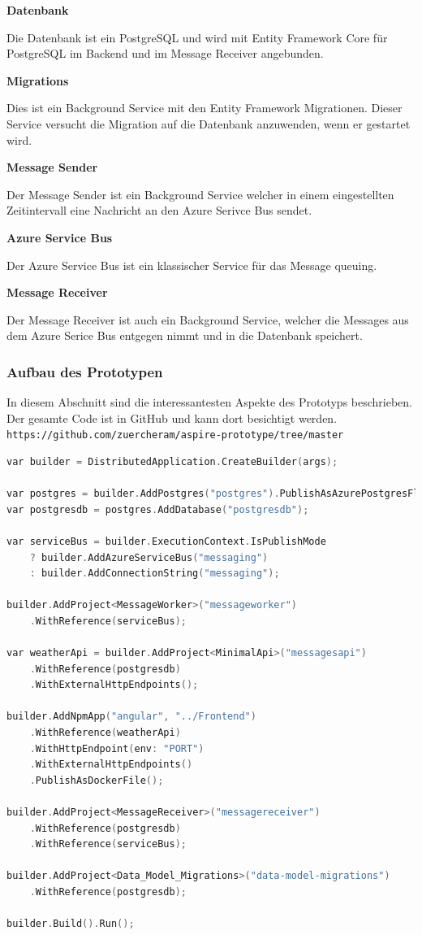             \textbf{Datenbank}

            Die Datenbank ist ein PostgreSQL und wird mit Entity Framework Core für PostgreSQL im Backend und im Message Receiver angebunden.

            \textbf{Migrations}

            Dies ist ein Background Service mit den Entity Framework Migrationen. Dieser Service versucht die Migration auf die Datenbank anzuwenden, wenn er gestartet wird.

            \textbf{Message Sender}
            
            Der Message Sender ist ein Background Service welcher in einem eingestellten Zeitintervall eine Nachricht an den Azure Serivce Bus sendet.

            \textbf{Azure Service Bus}
            
            Der Azure Service Bus ist ein klassischer Service für das Message queuing.

            \textbf{Message Receiver}

            Der Message Receiver ist auch ein Background Service, welcher die Messages aus dem Azure Serice Bus entgegen nimmt und in die Datenbank speichert.

        \subsubsection{Aufbau des Prototypen}

            In diesem Abschnitt sind die interessantesten Aspekte des Prototyps beschrieben. Der gesamte Code ist in GitHub und kann dort besichtigt werden.
            \verb|https://github.com/zuercheram/aspire-prototype/tree/master|

            \begin{lstlisting}[language=C, caption=Komposition der Serivces für den Aspire Prototypen]
var builder = DistributedApplication.CreateBuilder(args);

var postgres = builder.AddPostgres("postgres").PublishAsAzurePostgresFlexibleServer();
var postgresdb = postgres.AddDatabase("postgresdb");

var serviceBus = builder.ExecutionContext.IsPublishMode
    ? builder.AddAzureServiceBus("messaging")
    : builder.AddConnectionString("messaging");

builder.AddProject<MessageWorker>("messageworker")
    .WithReference(serviceBus);

var weatherApi = builder.AddProject<MinimalApi>("messagesapi")
    .WithReference(postgresdb)
    .WithExternalHttpEndpoints();

builder.AddNpmApp("angular", "../Frontend")
    .WithReference(weatherApi)
    .WithHttpEndpoint(env: "PORT")
    .WithExternalHttpEndpoints()
    .PublishAsDockerFile();

builder.AddProject<MessageReceiver>("messagereceiver")
    .WithReference(postgresdb)
    .WithReference(serviceBus);

builder.AddProject<Data_Model_Migrations>("data-model-migrations")
    .WithReference(postgresdb);

builder.Build().Run();
            \end{lstlisting}

